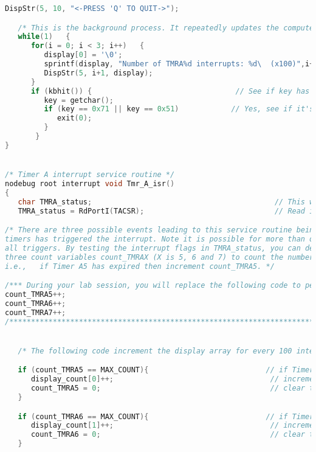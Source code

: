 \begin{lstlisting}[language=C]
   DispStr(5, 10, "<-PRESS 'Q' TO QUIT->");

   /* This is the background process. It repeatedly updates the computer monitor with the values in the display_count array */
   while(1)   {
      for(i = 0; i < 3; i++)   {
         display[0] = '\0';
         sprintf(display, "Number of TMRA%d interrupts: %d\  (x100)",i+5, display_count[i]);
         DispStr(5, i+1, display);
      }
      if (kbhit()) {                                 // See if key has been pressed
         key = getchar();
         if (key == 0x71 || key == 0x51)            // Yes, see if it's the q or Q key
            exit(0);
         }
       }
}


/* Timer A interrupt service routine */
nodebug root interrupt void Tmr_A_isr()
{
   char TMRA_status;                                          // This will hold the interrupt flags
   TMRA_status = RdPortI(TACSR);                              // Read interrupt flags and store to TMRA_status

/* There are three possible events leading to this service routine being called. Write code to determine which of the three
timers has triggered the interrupt. Note it is possible for more than one timer to expire at the same time, thus your code must service
all triggers. By testing the interrupt flags in TMRA_status, you can determine which counters have expired. Use
three count variables count_TMRAX (X is 5, 6 and 7) to count the number of interrupts. For each Timer AX interrupt you must increment the corresponding count variable.
i.e.,   if Timer A5 has expired then increment count_TMRA5. */

/*** During your lab session, you will replace the following code to perform as specified above ***/
count_TMRA5++;
count_TMRA6++;
count_TMRA7++;
/**************************************************************************************************/


   /* The following code increment the display array for every 100 interrupts for a respective timer, and resets the count variable */

   if (count_TMRA5 == MAX_COUNT){                           // if Timer A5 has interrupted the CPU 100 times
      display_count[0]++;                                    // increment the display counter
      count_TMRA5 = 0;                                       // clear the Timer A5 counter
   }

   if (count_TMRA6 == MAX_COUNT){                           // if Timer A6 has interrupted the CPU 100 times
      display_count[1]++;                                    // increment the display counter
      count_TMRA6 = 0;                                       // clear the Timer A6 counter
   }


\end{lstlisting}
